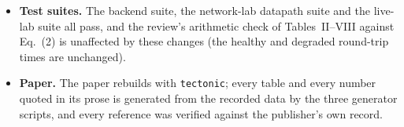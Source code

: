 \documentclass[11pt,a4paper]{article}
\begin{document}
\begin{itemize}
    follow: the settings now accept an alternative OpenAI-compatible
    endpoint
    (\texttt{LLM\_BASE\_URL}/\texttt{LLM\_API\_KEY}/\texttt{LLM\_MODEL}),
    and \texttt{reproduce.sh} now clears the LLM keys for the backend it
    starts, so the headline dataset is the deterministic fallback on any
    machine, with or without credentials.
  \item \textbf{Test suites.} The backend suite, the network-lab datapath
    suite and the live-lab suite all pass, and the review's arithmetic
    check of Tables~II--VIII against Eq.~(2) is unaffected by these changes
    (the healthy and degraded round-trip times are unchanged).
  \item \textbf{Paper.} The paper rebuilds with \texttt{tectonic}; every
    table and every number quoted in its prose is generated from the
    recorded data by the three generator scripts, and every reference was
    verified against the publisher's own record.
\end{itemize}
\end{document}
